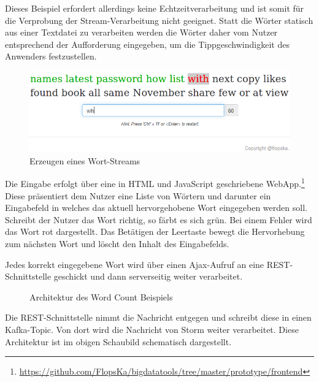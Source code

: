\documentclass[a4paper,11pt]{scrartcl}
\begin{document}
  Dieses Beispiel erfordert allerdings keine Echtzeitverarbeitung und ist somit
  für die Verprobung der Stream-Verarbeitung nicht geeignet. Statt die Wörter
  statisch aus einer Textdatei zu verarbeiten werden die Wörter daher vom
  Nutzer entsprechend der Aufforderung eingegeben, um die Tippgeschwindigkeit
  des Anwenders festzustellen.

  \begin{figure}[!h]
    \centering
    \includegraphics[scale=0.4,natwidth=750,natheight=234]{../presentation/img/webapp.png}
    \caption{Erzeugen eines Wort-Streams\protect\footnotemark}
  \end{figure}


  Die Eingabe erfolgt über eine in HTML und JavaScript geschriebene
  WebApp.\footnote{\url{https://github.com/FlopsKa/bigdatatools/tree/master/prototype/frontend}}
  Diese präsentiert dem Nutzer eine Liste von Wörtern und darunter ein
  Eingabefeld in welches das aktuell hervorgehobene Wort eingegeben werden
  soll. Schreibt der Nutzer das Wort richtig, so färbt es sich grün. Bei einem
  Fehler wird das Wort rot dargestellt.  Das Betätigen der Leertaste bewegt die
  Hervorhebung zum nächsten Wort und löscht den Inhalt des Eingabefelds.

  Jedes korrekt eingegebene Wort wird über einen Ajax-Aufruf an eine
  REST-Schnittstelle geschickt und dann serverseitig weiter
  verarbeitet.

  \begin{figure}[!h]
    \center
    \scalebox{.7}{}
    \caption{Architektur des Word Count Beispiels}
    \label{fig:wordcountsamplearchitecture}
  \end{figure}

  Die REST-Schnittstelle nimmt die Nachricht entgegen und schreibt
  diese in einen Kafka-Topic. Von dort wird die Nachricht von Storm
  weiter verarbeitet. Diese Architektur ist im obigen Schaubild
  schematisch dargestellt.
\end{document}
